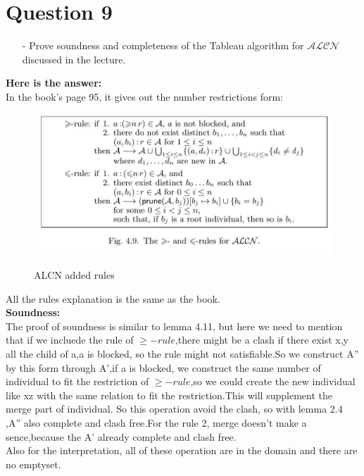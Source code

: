 \documentclass{article}
\begin{document}
    \section{Question 9}
    \begin{itemize}
        \item[-] Prove soundness and completeness of the Tableau algorithm for $\mathcal{ALCN}$ discussed in the lecture.
    \end{itemize}
    \textbf{Here is the answer:}\\
    In the book's page 95, it gives out the number restrictions form:\\
    \begin{figure}[H]
        \centering
        \includegraphics[width=1\textwidth]{2.png}\\
        \caption{ALCN added rules}
        \label{fig:ALCN added rules}
    \end{figure} 
    All the rules explanation is the same as the book.\\
    \textbf{Soundness:}\\
    The proof of soundness is similar to lemma 4.11, but here we need to mention that if we incluede the rule of $\geqslant-rule$,there might be a clash
    if there exist x,y all the child of a,a is blocked, so the rule might not satisfiable.So we construct A'' by this form through A',if a is blocked, we construct the same number of
    individual to fit the restriction of $\geqslant-rule$,so we could create the new individual like xz with the same relation to fit the restriction.This will supplement the merge part of individual.
    So this operation avoid the clash, so with lemma 2.4 ,A'' also complete and clash free.For the rule 2, merge doesn't make a sence,because the A' already complete and clash free.\\
    Also for the interpretation, all of these operation are in the domain and there are no emptyset.\\
\end{document}

